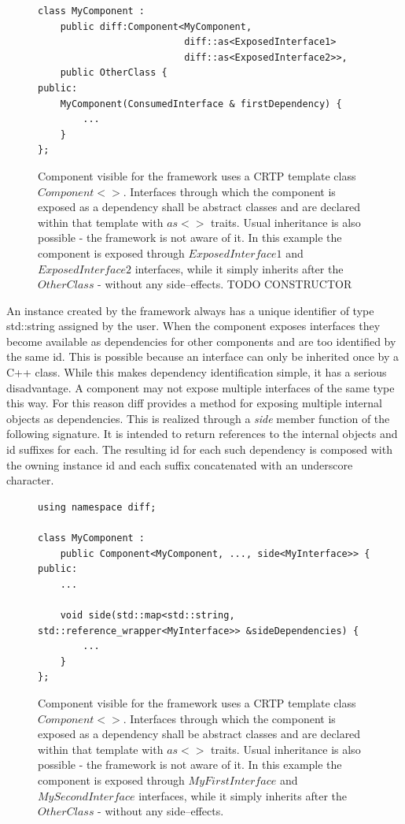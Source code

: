 \documentclass[preprint,12pt, a4paper]{elsarticle}
\begin{document}
\begin{figure}[ht]
    \centering
    {\scriptsize\begin{verbatim}
class MyComponent : 
    public diff:Component<MyComponent, 
                          diff::as<ExposedInterface1>
                          diff::as<ExposedInterface2>>, 
    public OtherClass {
public:
    MyComponent(ConsumedInterface & firstDependency) {
        ...
    }
};
\end{verbatim}}
    \caption{Component visible for the framework uses a CRTP template class $Component<>$. Interfaces through which the component is exposed as a dependency shall be abstract classes and are declared within that template with $as<>$ traits. Usual inheritance is also possible - the framework is not aware of it. In this example the component is exposed through $ExposedInterface1$ and $ExposedInterface2$ interfaces, while it simply inherits after the $OtherClass$ - without any side--effects. TODO CONSTRUCTOR}
    \label{fig:component_implementation}
\end{figure}

An instance created by the framework always has a unique identifier of type std::string assigned by the user. When the component exposes interfaces they become available as dependencies for other components and are too identified by the same id. This is possible because an interface can only be inherited once by a C++ class. While this makes dependency identification simple, it has a serious disadvantage. A component may not expose multiple interfaces of the same type this way. For this reason diff provides a method for exposing multiple internal objects as dependencies. This is realized through a \textit{side} member function of the following signature. It is intended to return references to the internal objects and id suffixes for each. The resulting id for each such dependency is composed with the owning instance id and each suffix concatenated with an underscore character.

\begin{figure}[ht]
    \centering
    {\scriptsize\begin{verbatim}
using namespace diff;

class MyComponent : 
    public Component<MyComponent, ..., side<MyInterface>> {
public:
    ... 

    void side(std::map<std::string, std::reference_wrapper<MyInterface>> &sideDependencies) {
        ...
    }
};
\end{verbatim}}
    \caption{Component visible for the framework uses a CRTP template class $Component<>$. Interfaces through which the component is exposed as a dependency shall be abstract classes and are declared within that template with $as<>$ traits. Usual inheritance is also possible - the framework is not aware of it. In this example the component is exposed through $MyFirstInterface$ and $MySecondInterface$ interfaces, while it simply inherits after the $OtherClass$ - without any side--effects.}
    \label{fig:aaa}
\end{figure}
\end{document}

